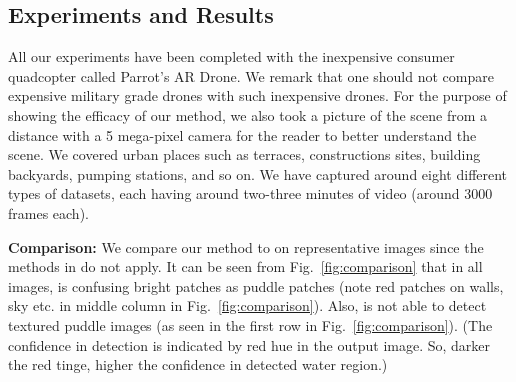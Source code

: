 \documentclass[11pt]{article}
\begin{document}
\subsection{Experiments and Results}

All our experiments have been completed with the inexpensive consumer
quadcopter called Parrot's AR Drone. We remark that one should not
compare expensive military grade drones with such inexpensive drones.
For the purpose of showing the efficacy of our method, we also took a
picture of the scene from a distance with a 5 mega-pixel camera for
the reader to better understand the scene.  We covered urban places
such as terraces, constructions sites, building backyards,
pumping stations, and so on.  We have captured around eight different
types of datasets, each having around two-three minutes of video
(around 3000 frames each). 

\textbf{Comparison:} We compare our method to \cite{rankin2004daytime} on
representative images since the methods in \cite{rankin11} do not apply. 
It can be seen from Fig.~\ref{fig:comparison} that in all images,
\cite{rankin2004daytime} is confusing  bright patches as puddle patches (note
red patches on walls, sky etc. in middle column in Fig.~\ref{fig:comparison}).
Also, \cite{rankin2004daytime} is not able to detect textured puddle images (as
seen in the first row in Fig.~\ref{fig:comparison}). (The confidence in
detection is indicated by red hue in the output image. So, darker the red
tinge, higher the confidence in detected water region.)
\end{document}
